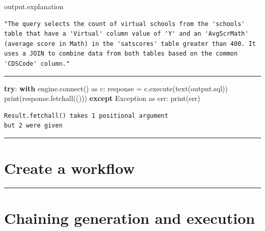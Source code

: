 \documentclass[
  letterpaper,
  DIV=11,
  numbers=noendperiod]{scrartcl}
\newenvironment{Shaded}{\begin{snugshade}}{\end{snugshade}}
\newcommand{\BuiltInTok}[1]{\textcolor[rgb]{0.00,0.23,0.31}{#1}}
\newcommand{\ControlFlowTok}[1]{\textcolor[rgb]{0.00,0.23,0.31}{\textbf{#1}}}
\newcommand{\ExtensionTok}[1]{\textcolor[rgb]{0.00,0.23,0.31}{#1}}
\newcommand{\ImportTok}[1]{\textcolor[rgb]{0.00,0.46,0.62}{#1}}
\newcommand{\NormalTok}[1]{\textcolor[rgb]{0.00,0.23,0.31}{#1}}
\newcommand{\OperatorTok}[1]{\textcolor[rgb]{0.37,0.37,0.37}{#1}}
\newcommand{\PreprocessorTok}[1]{\textcolor[rgb]{0.68,0.00,0.00}{#1}}
\begin{document}
\begin{Shaded}
\begin{Highlighting}[]
\NormalTok{output.explanation}
\end{Highlighting}
\end{Shaded}

\begin{verbatim}
"The query selects the count of virtual schools from the 'schools' table that have a 'Virtual' column value of 'Y' and an 'AvgScrMath' (average score in Math) in the 'satscores' table greater than 400. It uses a JOIN to combine data from both tables based on the common 'CDSCode' column."
\end{verbatim}

\begin{center}\rule{0.5\linewidth}{0.5pt}\end{center}

\begin{Shaded}
\begin{Highlighting}[]
\ControlFlowTok{try}\NormalTok{:}
  \ControlFlowTok{with}\NormalTok{ engine.}\ExtensionTok{connect}\NormalTok{() }\ImportTok{as}\NormalTok{ c:}
\NormalTok{    response }\OperatorTok{=}\NormalTok{ c.execute(text(output.sql))}
    \BuiltInTok{print}\NormalTok{(response.fetchall(()))}
\ControlFlowTok{except} \PreprocessorTok{Exception} \ImportTok{as}\NormalTok{ err:}
  \BuiltInTok{print}\NormalTok{(err)}
\end{Highlighting}
\end{Shaded}

\begin{verbatim}
Result.fetchall() takes 1 positional argument
but 2 were given
\end{verbatim}

\begin{center}\rule{0.5\linewidth}{0.5pt}\end{center}

\section{Create a workflow}\label{create-a-workflow}

\begin{center}\rule{0.5\linewidth}{0.5pt}\end{center}

\section{Chaining generation and
execution}\label{chaining-generation-and-execution}
\end{document}
